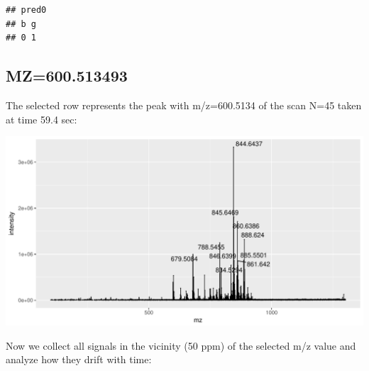 \documentclass[]{article}
\newenvironment{Shaded}{\begin{snugshade}}{\end{snugshade}}
\newcommand{\KeywordTok}[1]{\textcolor[rgb]{0.13,0.29,0.53}{\textbf{#1}}}
\newcommand{\FloatTok}[1]{\textcolor[rgb]{0.00,0.00,0.81}{#1}}
\newcommand{\StringTok}[1]{\textcolor[rgb]{0.31,0.60,0.02}{#1}}
\newcommand{\OperatorTok}[1]{\textcolor[rgb]{0.81,0.36,0.00}{\textbf{#1}}}
\newcommand{\NormalTok}[1]{#1}
\begin{document}
\begin{verbatim}
## pred0
## b g 
## 0 1
\end{verbatim}

\subsection{MZ=600.513493}\label{mz600.513493}

\begin{Shaded}
\end{Shaded}

The selected row represents the peak with m/z=600.5134 of the scan N=45
taken at time 59.4 sec:

\begin{Shaded}
\end{Shaded}

\includegraphics{Supplementary_document_files/figure-latex/ion.plots.600-1.pdf}

Now we collect all signals in the vicinity (50 ppm) of the selected m/z
value and analyze how they drift with time:

\begin{Shaded}
\end{Shaded}
\end{document}
